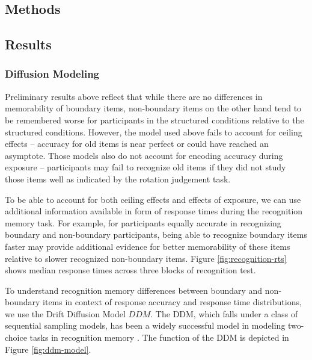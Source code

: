 \subsection{Methods}

\subsection{Results}

\subsubsection{Diffusion Modeling}
Preliminary results above reflect that while there are no differences in memorability of boundary items, non-boundary items on the other hand tend to be remembered worse for participants in the structured conditions relative to the structured conditions. However, the model used above fails to account for ceiling effects -- accuracy for old items is near perfect or could have reached an asymptote. Those models also do not account for encoding accuracy during exposure -- participants may fail to recognize old items if they did not study those items well as indicated by the rotation judgement task. 

To be able to account for both ceiling effects and effects of exposure, we can use additional information available in form of response times during the recognition memory task. For example, for participants equally accurate in recognizing boundary and non-boundary participants, being able to recognize boundary items faster may provide additional evidence for better memorability of these items relative to slower recognized non-boundary items. Figure \ref{fig:recognition-rts} shows median response times across three blocks of recognition test. 

To understand recognition memory differences between boundary and non-boundary items in context of response accuracy and response time distributions, we use the Drift Diffusion Model \(DDM\). The DDM, which falls under a class of sequential sampling models, has been a widely successful model in modeling two-choice tasks in recognition memory \cite{ratcliff2004diffusion, ratcliff2022discriminating, starns2014using, starns2014validating, ratcliff2009modeling}. The function of the DDM is depicted in Figure \ref{fig:ddm-model}. 


